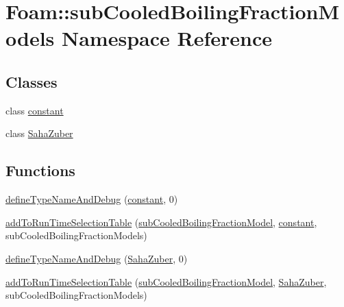 \hypertarget{namespaceFoam_1_1subCooledBoilingFractionModels}{}\section{Foam\+:\+:sub\+Cooled\+Boiling\+Fraction\+Models Namespace Reference}
\label{namespaceFoam_1_1subCooledBoilingFractionModels}
\subsection*{Classes}
\begin{DoxyCompactItemize}
\item 
class \hyperlink{classFoam_1_1subCooledBoilingFractionModels_1_1constant}{constant}
\item 
class \hyperlink{classFoam_1_1subCooledBoilingFractionModels_1_1SahaZuber}{Saha\+Zuber}
\end{DoxyCompactItemize}
\subsection*{Functions}
\begin{DoxyCompactItemize}
\item 
\hyperlink{namespaceFoam_1_1subCooledBoilingFractionModels_ae3920245eb4ce9db7618886e25304e96}{define\+Type\+Name\+And\+Debug} (\hyperlink{classFoam_1_1subCooledBoilingFractionModels_1_1constant}{constant}, 0)
\item 
\hyperlink{namespaceFoam_1_1subCooledBoilingFractionModels_ab171b70bbc26f3e5119211da29e2bd51}{add\+To\+Run\+Time\+Selection\+Table} (\hyperlink{classFoam_1_1subCooledBoilingFractionModel}{sub\+Cooled\+Boiling\+Fraction\+Model}, \hyperlink{classFoam_1_1subCooledBoilingFractionModels_1_1constant}{constant}, sub\+Cooled\+Boiling\+Fraction\+Models)
\item 
\hyperlink{namespaceFoam_1_1subCooledBoilingFractionModels_a3235dacf837bd6a7f36dffbe1865fc35}{define\+Type\+Name\+And\+Debug} (\hyperlink{classFoam_1_1subCooledBoilingFractionModels_1_1SahaZuber}{Saha\+Zuber}, 0)
\item 
\hyperlink{namespaceFoam_1_1subCooledBoilingFractionModels_a61a8cb5ed0f9c94702326fa8e05b113c}{add\+To\+Run\+Time\+Selection\+Table} (\hyperlink{classFoam_1_1subCooledBoilingFractionModel}{sub\+Cooled\+Boiling\+Fraction\+Model}, \hyperlink{classFoam_1_1subCooledBoilingFractionModels_1_1SahaZuber}{Saha\+Zuber}, sub\+Cooled\+Boiling\+Fraction\+Models)
\end{DoxyCompactItemize}


